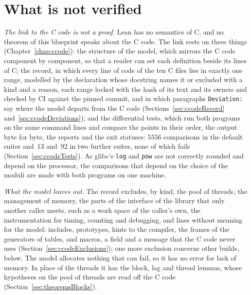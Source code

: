 \section{What is not verified}\label{sec:overviewNotVerified}

\emph{The link to the C code is not a proof.} Lean has no semantics of C, and no theorem of this
blueprint speaks about the C code. The link rests on three things (Chapter~\ref{chap:ccode}): the
structure of the model, which mirrors the C code component by component, so that a reader can set
each definition beside its lines of C; the record, in which every line of code of the ten C files
lies in exactly one range, modelled by the declaration whose docstring names it or excluded with a
kind and a reason, each range locked with the hash of its text and its owners and checked by CI
against the pinned commit, and in which paragraphs \verb|Deviation:| say where the model departs
from the C code (Sections~\ref{sec:ccodeRecord} and~\ref{sec:ccodeDeviations}); and the
differential tests, which run both programs on the same command lines and compare the points in
their order, the output byte for byte, the reports and the exit statuses: $5556$ comparisons in the
default suites and~$13$ and~$92$ in two further suites, none of which fails
(Section~\ref{sec:ccodeTests}). As glibc's \verb|log| and \verb|pow| are not correctly rounded and
depend on the processor, the comparisons that depend on the choice of the moduli are made with both
programs on one machine.

\emph{What the model leaves out.} The record excludes, by kind, the pool of threads, the management
of memory, the parts of the interface of the library that only another caller meets, such as a
work space of the caller's own, the instrumentation for timing, counting and debugging, and lines
without meaning for the model: includes, prototypes, hints to the compiler, the frames of the
generators of tables, and macros, a field and a message that the C code never uses
(Section~\ref{sec:ccodeExclusions}); one more exclusion concerns other builds, below. The model
allocates nothing that can fail, so it has no error for lack of memory. In place of the threads it
has the block, lag and thread lemmas, whose hypotheses on the pool of threads are read off the C
code (Section~\ref{sec:theoremsBlocks}).

